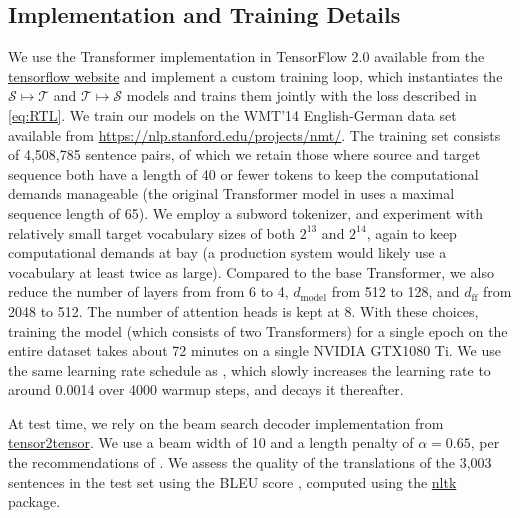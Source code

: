 \documentclass[11pt,a4paper]{article}
\begin{document}
\subsection{Implementation and Training Details}
We use the Transformer implementation in TensorFlow 2.0 available from the \href{https://www.tensorflow.org/tutorials/text/transformer}{tensorflow website} and implement a custom training loop, which instantiates the $\mathcal{S}\mapsto\mathcal{T}$ and $\mathcal{T}\mapsto\mathcal{S}$ models and trains them jointly with the loss described in \eqref{eq:RTL}. We train our models on the WMT'14 English-German data set available from \href{https://nlp.stanford.edu/projects/nmt/}{https://nlp.stanford.edu/projects/nmt/}. The training set consists of 4,508,785 sentence pairs, of which we retain those where source and target sequence both have a length of 40 or fewer tokens to keep the computational demands manageable (the original Transformer model in \citet{transformer} uses a maximal sequence length of 65). We employ a subword tokenizer, and experiment with relatively small target vocabulary sizes of both $2^{13}$ and $2^{14}$, again to keep computational demands at bay (a production system would likely use a vocabulary at least twice as large). Compared to the base Transformer, we also reduce the number of layers from from 6 to 4, $d_{\text{model}}$ from 512 to 128, and $d_{\text{ff}}$ from 2048 to 512. The number of attention heads is kept at 8.
With these choices, training the model (which consists of two Transformers) for a single epoch on the entire dataset takes about 72 minutes on a single NVIDIA GTX1080 Ti. We use the same learning rate schedule as \cite{transformer}, which slowly increases the learning rate to around 0.0014 over 4000 warmup steps, and decays it thereafter.


At test time, we rely on the beam search decoder implementation from \href{https://github.com/tensorflow/tensor2tensor/blob/master/tensor2tensor/utils}{tensor2tensor}. We use a beam width of 10 and a length penalty of $\alpha=0.65$, per the recommendations of \citet{googlenmt}. We assess the quality of the translations of the 3,003 sentences in the test set using the BLEU score \citep{bleu}, computed using the \href{https://www.nltk.org/}{nltk} package.
\end{document}
